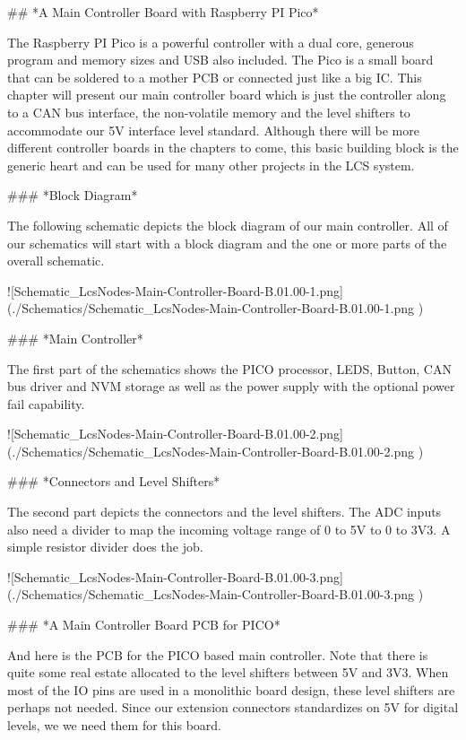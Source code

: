 ## *A Main Controller Board with Raspberry PI Pico*

The Raspberry PI Pico is a powerful controller with a dual core, generous program and memory sizes and USB also included. The Pico is a small board that can be soldered to a mother PCB or connected just like a big IC. This chapter will present our main controller board which is just the controller along to a CAN bus interface, the non-volatile memory and the level shifters to accommodate our 5V interface level standard. Although there will be more different controller boards in the chapters to come, this basic building block is the generic heart and can be used for many other projects in the LCS system.

### *Block Diagram*

The following schematic depicts the block diagram of our main controller. All of our schematics will start with a block diagram and the one or more parts of the overall schematic.

![Schematic_LcsNodes-Main-Controller-Board-B.01.00-1.png](./Schematics/Schematic_LcsNodes-Main-Controller-Board-B.01.00-1.png )

### *Main Controller*

The first part of the schematics shows the PICO processor, LEDS, Button, CAN bus driver and NVM storage as well as the power supply with the optional power fail capability.

![Schematic_LcsNodes-Main-Controller-Board-B.01.00-2.png](./Schematics/Schematic_LcsNodes-Main-Controller-Board-B.01.00-2.png )

### *Connectors and Level Shifters*

The second part depicts the connectors and the level shifters. The ADC inputs also need a divider to map the incoming voltage range of 0 to 5V to 0 to 3V3. A simple resistor divider does the job.

![Schematic_LcsNodes-Main-Controller-Board-B.01.00-3.png](./Schematics/Schematic_LcsNodes-Main-Controller-Board-B.01.00-3.png )

### *A Main Controller Board PCB for PICO*

And here is the PCB for the PICO based main controller. Note that there is quite some real estate allocated to the level shifters between 5V and 3V3. When most of the IO pins are used in a monolithic board design, these level shifters are perhaps not needed. Since our extension connectors standardizes on 5V for digital levels, we we need them for this board.

